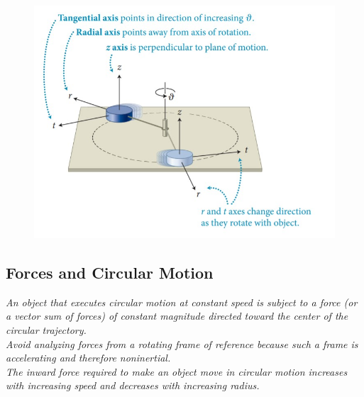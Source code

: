         \begin{figure}[hbt!]
            \centering
            \includegraphics[scale=0.5]{Resources/rotational_coords}
        \end{figure}

    \subsection{Forces and Circular Motion}

        \textit{An object that executes circular motion at constant speed is subject to a force (or a vector sum of forces) of constant magnitude directed toward the center of the circular trajectory.} \\

        \textit{Avoid analyzing forces from a rotating frame of reference because such a frame is accelerating and therefore noninertial.} \\

        \textit{The inward force required to make an object move in circular motion increases with increasing speed and decreases with increasing radius.}